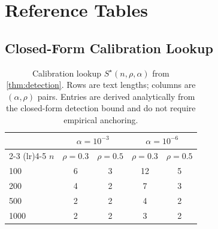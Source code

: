 \section{Reference Tables}
\label{app:results}

\subsection{Closed-Form Calibration Lookup}

\begin{table}[h]
  \centering
  \caption{Calibration lookup $S^\star(n, \rho, \alpha)$ from
    \autoref{thm:detection}.  Rows are text lengths; columns are
    $(\alpha, \rho)$ pairs.  Entries are derived analytically from the
    closed-form detection bound and do not require empirical anchoring.}
  \label{tab:cal}
  \begin{tabular}{lcccc}
    \toprule
    & \multicolumn{2}{c}{$\alpha = 10^{-3}$}
    & \multicolumn{2}{c}{$\alpha = 10^{-6}$} \\
    \cmidrule(lr){2-3} \cmidrule(lr){4-5}
    $n$ & $\rho{=}0.3$ & $\rho{=}0.5$ & $\rho{=}0.3$ & $\rho{=}0.5$ \\
    \midrule
    100  & 6 & 3 & 12 & 5 \\
    200  & 4 & 2 & 7  & 3 \\
    500  & 2 & 2 & 4  & 2 \\
    1000 & 2 & 2 & 3  & 2 \\
    \bottomrule
  \end{tabular}
\end{table}
